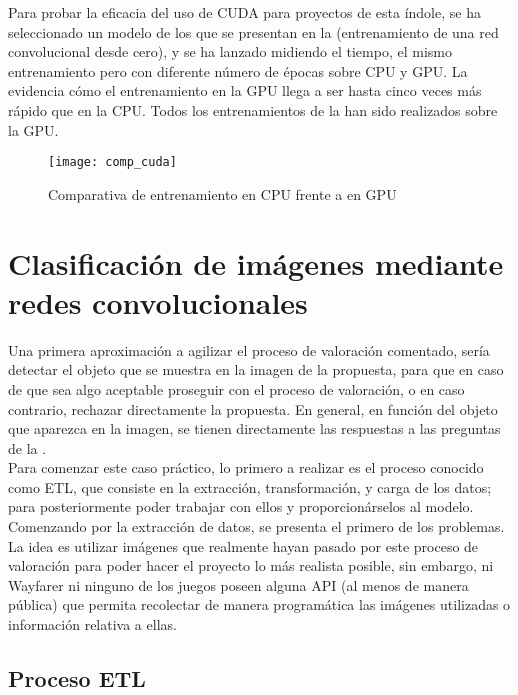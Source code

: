 			Para probar la eficacia del uso de CUDA para proyectos de esta índole, se ha seleccionado un modelo de los que se presentan en la  (entrenamiento de una red convolucional desde cero), y se ha lanzado midiendo el tiempo, el mismo entrenamiento pero con diferente número de épocas sobre CPU y GPU. La  evidencia cómo el entrenamiento en la GPU llega a ser hasta cinco veces más rápido que en la CPU. Todos los entrenamientos de la  han sido realizados sobre la GPU. 
			
			\begin{figure}[!h]
				\centering
				\texttt{[image: comp\_cuda]}
				\caption{Comparativa de entrenamiento en CPU frente a en GPU}
				\label{fig:comparativa_cuda}
			\end{figure}

	\section{Clasificación de imágenes mediante redes convolucionales}
	
		Una primera aproximación a agilizar el proceso de valoración comentado, sería detectar el objeto que se muestra en la imagen de la propuesta, para que en caso de que sea algo aceptable proseguir con el proceso de valoración, o en caso contrario, rechazar directamente la propuesta. En general, en función del objeto que aparezca en la imagen, se tienen directamente las respuestas a las preguntas de la . \\
		
		Para comenzar este caso práctico, lo primero a realizar es el proceso conocido como ETL, que consiste en la extracción, transformación, y carga de los datos; para posteriormente poder trabajar con ellos y proporcionárselos al modelo. Comenzando por la extracción de datos, se presenta el primero de los problemas. La idea es utilizar imágenes que realmente hayan pasado por este proceso de valoración para poder hacer el proyecto lo más realista posible, sin embargo, ni Wayfarer ni ninguno de los juegos poseen alguna API (al menos de manera pública) que permita recolectar de manera programática las imágenes utilizadas o información relativa a ellas. 
		
		\subsection{Proceso ETL}
		
